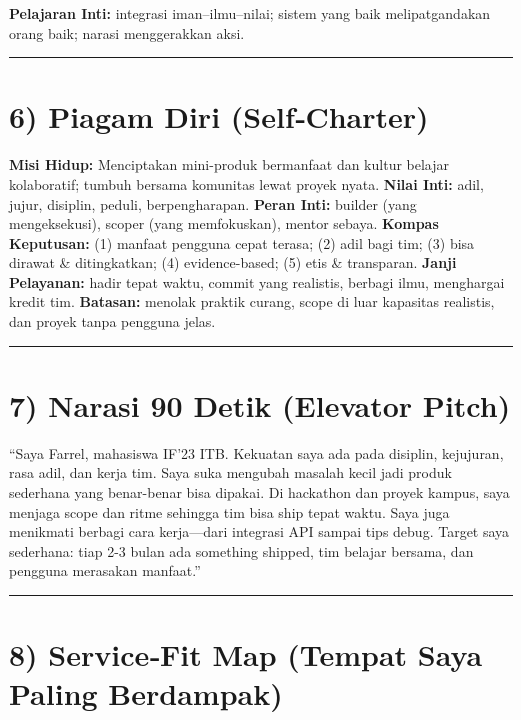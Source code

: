 \documentclass[
  letterpaper,
  DIV=11,
  numbers=noendperiod]{scrreprt}
\begin{document}
\textbf{Pelajaran Inti:} integrasi iman--ilmu--nilai; sistem yang baik
melipatgandakan orang baik; narasi menggerakkan aksi.

\begin{center}\rule{0.5\linewidth}{0.5pt}\end{center}

\section{6) Piagam Diri (Self‑Charter)}\label{piagam-diri-selfcharter}

\textbf{Misi Hidup:} Menciptakan mini-produk bermanfaat dan kultur
belajar kolaboratif; tumbuh bersama komunitas lewat proyek nyata.
\textbf{Nilai Inti:} adil, jujur, disiplin, peduli, berpengharapan.
\textbf{Peran Inti:} builder (yang mengeksekusi), scoper (yang
memfokuskan), mentor sebaya. \textbf{Kompas Keputusan:} (1) manfaat
pengguna cepat terasa; (2) adil bagi tim; (3) bisa dirawat \&
ditingkatkan; (4) evidence-based; (5) etis \& transparan. \textbf{Janji
Pelayanan:} hadir tepat waktu, commit yang realistis, berbagi ilmu,
menghargai kredit tim. \textbf{Batasan:} menolak praktik curang, scope
di luar kapasitas realistis, dan proyek tanpa pengguna jelas.

\begin{center}\rule{0.5\linewidth}{0.5pt}\end{center}

\section{7) Narasi 90 Detik (Elevator
Pitch)}\label{narasi-90-detik-elevator-pitch}

``Saya Farrel, mahasiswa IF'23 ITB. Kekuatan saya ada pada disiplin,
kejujuran, rasa adil, dan kerja tim. Saya suka mengubah masalah kecil
jadi produk sederhana yang benar-benar bisa dipakai. Di hackathon dan
proyek kampus, saya menjaga scope dan ritme sehingga tim bisa ship tepat
waktu. Saya juga menikmati berbagi cara kerja---dari integrasi API
sampai tips debug. Target saya sederhana: tiap 2-3 bulan ada something
shipped, tim belajar bersama, dan pengguna merasakan manfaat.''

\begin{center}\rule{0.5\linewidth}{0.5pt}\end{center}

\section{8) Service‑Fit Map (Tempat Saya Paling
Berdampak)}\label{servicefit-map-tempat-saya-paling-berdampak}
\end{document}
